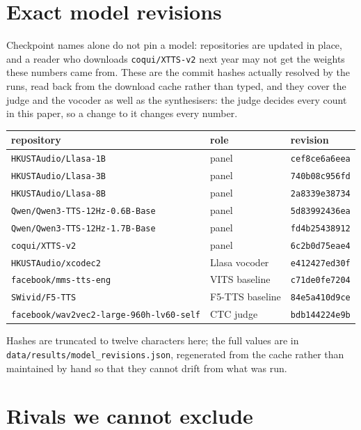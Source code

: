 \documentclass[11pt]{article}
\begin{document}
\section{Exact model revisions}

Checkpoint names alone do not pin a model: repositories are updated in place, and
a reader who downloads \texttt{coqui/XTTS-v2} next year may not get the weights
these numbers came from. These are the commit hashes actually resolved by the
runs, read back from the download cache rather than typed, and they cover the
judge and the vocoder as well as the synthesisers: the judge decides every
count in this paper, so a change to it changes every number.

\begin{center}
\begin{tabular}{lll}
\toprule
repository & role & revision \\
\midrule
\texttt{HKUSTAudio/Llasa-1B} & panel & \texttt{cef8ce6a6eea} \\
\texttt{HKUSTAudio/Llasa-3B} & panel & \texttt{740b08c956fd} \\
\texttt{HKUSTAudio/Llasa-8B} & panel & \texttt{2a8339e38734} \\
\texttt{Qwen/Qwen3-TTS-12Hz-0.6B-Base} & panel & \texttt{5d83992436ea} \\
\texttt{Qwen/Qwen3-TTS-12Hz-1.7B-Base} & panel & \texttt{fd4b25438912} \\
\texttt{coqui/XTTS-v2} & panel & \texttt{6c2b0d75eae4} \\
\texttt{HKUSTAudio/xcodec2} & Llasa vocoder & \texttt{e412427ed30f} \\
\texttt{facebook/mms-tts-eng} & VITS baseline & \texttt{c71de0fe7204} \\
\texttt{SWivid/F5-TTS} & F5-TTS baseline & \texttt{84e5a410d9ce} \\
\texttt{facebook/wav2vec2-large-960h-lv60-self} & CTC judge & \texttt{bdb144224e9b} \\
\bottomrule
\end{tabular}
\end{center}

\noindent Hashes are truncated to twelve characters here; the full values are in
\texttt{data/results/model\_revisions.json}, regenerated from the cache rather
than maintained by hand so that they cannot drift from what was run.


\section{Rivals we cannot exclude}
\end{document}
